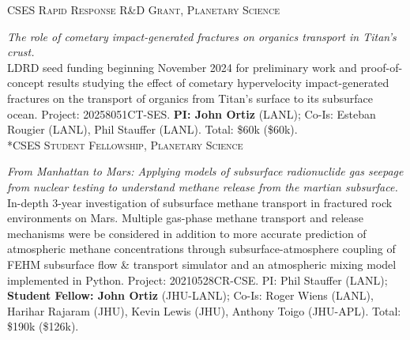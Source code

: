\documentclass[11pt, letterpaper]{article}
\newcommand{\years}[1]{\marginnote{\scriptsize #1}}
\begin{document}
\years{2024}\textsc{CSES Rapid Response R\&D Grant, Planetary
Science}

    \textit{The role of cometary impact-generated fractures
    on organics transport in Titan's crust.}\\
    LDRD seed funding beginning November 2024 for preliminary work and
    proof-of-concept results studying the effect of cometary hypervelocity
    impact-generated fractures on the transport of organics from Titan's
    surface to its subsurface ocean. Project: 20258051CT-SES.  \textbf{PI: John
    Ortiz} (LANL); Co-Is: Esteban Rougier (LANL), Phil Stauffer (LANL).  Total:
    \$60k (\$60k).\\

\years{2021-2024}\textsc{*CSES Student Fellowship, Planetary Science}

    \textit{From Manhattan to Mars: Applying models of subsurface radionuclide
    gas seepage from nuclear testing to understand methane release from the
    martian subsurface.}\\
    In-depth 3-year investigation of subsurface methane transport in fractured
    rock environments on Mars. Multiple gas-phase methane transport and release
    mechanisms were be considered in addition to more accurate prediction of
    atmospheric methane concentrations through subsurface-atmosphere coupling
    of \textsc{FEHM} subsurface flow \& transport simulator and an atmospheric
    mixing model implemented in Python. Project: 20210528CR-CSE.
    PI: Phil Stauffer (LANL); \textbf{Student Fellow: John Ortiz} (JHU-LANL); Co-Is:
    Roger Wiens (LANL), Harihar Rajaram (JHU), Kevin Lewis (JHU), Anthony Toigo
    (JHU-APL). Total: \$190k (\$126k).\\
\end{document}
